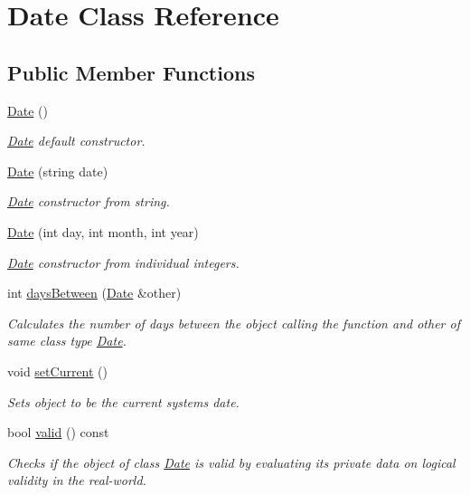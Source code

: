\hypertarget{class_date}{}\section{Date Class Reference}
\label{class_date}
\subsection*{Public Member Functions}
\begin{DoxyCompactItemize}
\item 
\hyperlink{group___date_ga4e59ed4ba66eec61c27460c5d09fa1bd}{Date} ()
\begin{DoxyCompactList}\small\item\em \hyperlink{class_date}{Date} default constructor. \end{DoxyCompactList}\item 
\hyperlink{group___date_ga5532efafed41fd5f8e013a61313200dc}{Date} (string date)
\begin{DoxyCompactList}\small\item\em \hyperlink{class_date}{Date} constructor from string. \end{DoxyCompactList}\item 
\hyperlink{group___date_gab1ad19969fa570605a6b0cd32b0da822}{Date} (int day, int month, int year)
\begin{DoxyCompactList}\small\item\em \hyperlink{class_date}{Date} constructor from individual integers. \end{DoxyCompactList}\item 
int \hyperlink{group___date_ga9168133cb290c4f378699037ef7b5d4a}{days\+Between} (\hyperlink{class_date}{Date} \&other)
\begin{DoxyCompactList}\small\item\em Calculates the number of days between the object calling the function and other of same class type \hyperlink{class_date}{Date}. \end{DoxyCompactList}\item 
void \hyperlink{group___date_gac47ebbacb1a76c4e7c1f55ca9072a640}{set\+Current} ()
\begin{DoxyCompactList}\small\item\em Sets object to be the current system\textquotesingle{}s date. \end{DoxyCompactList}\item 
bool \hyperlink{group___date_gac7a8c7b77f99b162a931199464c1bedc}{valid} () const
\begin{DoxyCompactList}\small\item\em Checks if the object of class \hyperlink{class_date}{Date} is valid by evaluating it\textquotesingle{}s private data on logical validity in the real-\/world. \end{DoxyCompactList}\end{DoxyCompactItemize}
